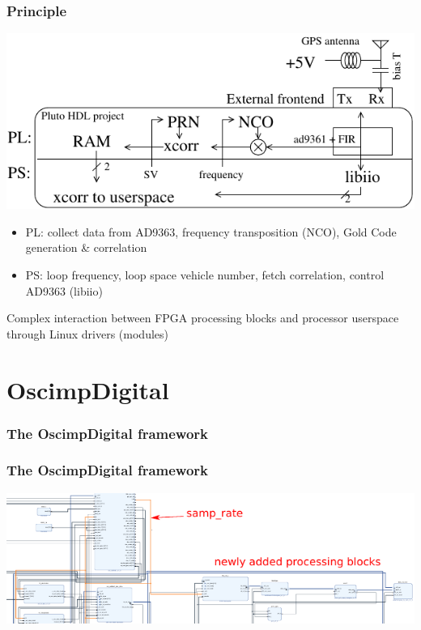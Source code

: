 \documentclass[compress,10pt]{beamer}
\begin{document}
\begin{frame}[fragile]\frametitle{Principle}

\begin{center}
\includegraphics[width=.8\linewidth]{pluto-oscimpDigital-objective}
\end{center}

\begin{itemize}
\item PL: collect data from AD9363, frequency transposition (NCO), Gold Code generation \& correlation
\item PS: loop frequency, loop space vehicle number, fetch correlation, control AD9363 (libiio)
\end{itemize}

Complex interaction between FPGA processing blocks and processor userspace through
Linux drivers (modules)
\end{frame}

\section{OscimpDigital}
\begin{frame}[fragile]\frametitle{The OscimpDigital framework}

\begin{minipage}[t]{\linewidth}
\begin{minipage}{.49\linewidth}
\end{minipage}
\begin{minipage}{.49\linewidth}
\end{minipage}
\end{minipage}
\end{frame}

\begin{frame}[fragile]\frametitle{The OscimpDigital framework}
\hspace*{-1.3cm}\includegraphics[width=1.15\linewidth]{1xcorr_1PRN_crop.pdf}
\end{frame}
\end{document}
